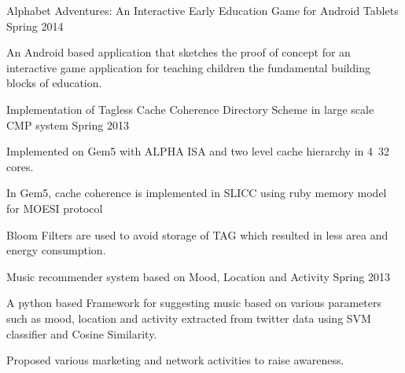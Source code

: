 

\begin{cvprojects}

  \cvproject
    {}
    {Alphabet Adventures: An Interactive Early Education Game for Android Tablets} %
    {Spring 2014} %
    {}
    {
      \begin{cvitems} %
      \item{An Android based application that sketches the proof of concept for an interactive game application for teaching
children the fundamental building blocks of education.}
      \end{cvitems}
    }

  \cvproject
    {}
    {Implementation of Tagless Cache Coherence Directory Scheme in large scale CMP system} %
    {Spring 2013} %
    {}
    {
      \begin{cvitems} %
      \item{Implemented on Gem5 with ALPHA ISA and two level cache hierarchy in 4~32 cores.}
      \item{In Gem5, cache coherence is implemented in SLICC using ruby memory model for MOESI protocol}
      \item{Bloom Filters are used to avoid storage of TAG which resulted in less area and energy consumption.}
      \end{cvitems}
    }

  \cvproject
    {}
    {Music recommender system based on Mood, Location and Activity} %
    {Spring 2013} %
    {}
    {
      \begin{cvitems} %
        \item {A python based Framework for suggesting music based on various parameters such as mood, location and
activity extracted from twitter data using SVM classifier and Cosine Similarity.}
        \item {Proposed various marketing and network activities to raise awareness.}
      \end{cvitems}
    }


\end{cvprojects}
